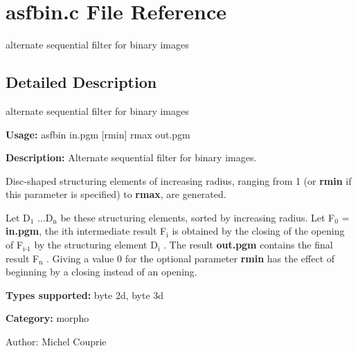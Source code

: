 \section{asfbin.c File Reference}
\label{asfbin_8c}
alternate sequential filter for binary images 



\subsection{Detailed Description}
alternate sequential filter for binary images 

{\bf Usage:} asfbin in.pgm [rmin] rmax out.pgm

{\bf Description:} Alternate sequential filter for binary images.

Disc-shaped structuring elements of increasing radius, ranging from 1 (or {\bf rmin} if this parameter is specified) to {\bf rmax}, are generated.

Let D$_{\mbox{1}}$ ...D$_{\mbox{n}}$  be these structuring elements, sorted by increasing radius. Let F$_{\mbox{0}}$  = {\bf in.pgm}, the ith intermediate result F$_{\mbox{i}}$  is obtained by the closing of the opening of F$_{\mbox{i-1}}$  by the structuring element D$_{\mbox{i}}$ . The result {\bf out.pgm} contains the final result F$_{\mbox{n}}$ . Giving a value 0 for the optional parameter {\bf rmin} has the effect of beginning by a closing instead of an opening.

{\bf Types supported:} byte 2d, byte 3d

{\bf Category:} morpho

\begin{Desc}
\item[Author:]Michel Couprie \end{Desc}
